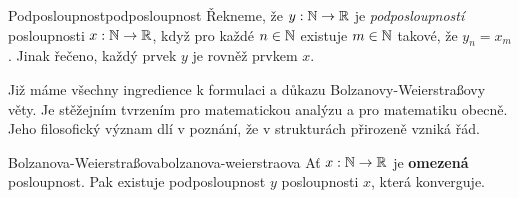 \begin{definition}{Podposloupnost}{podposloupnost}
 Řekneme, že $y:\mathbb{N} \to \mathbb{R}$ je \emph{podposloupností} posloupnosti $x:\mathbb{N} \to \mathbb{R}$,
 když pro každé $n \in \mathbb{N}$ existuje $m \in \mathbb{N}$ takové, že $y_n = x_m$. Jinak
 řečeno, každý prvek $y$ je rovněž prvkem $x$.
\end{definition}

Již máme všechny ingredience k formulaci a důkazu Bolzanovy-Weierstraßovy věty.
Je stěžejním tvrzením pro matematickou analýzu a pro matematiku obecně. Jeho
filosofický význam dlí v poznání, že v  strukturách přirozeně
vzniká řád.

\begin{theorem}{Bolzanova-Weierstraßova}{bolzanova-weierstraova}
 Ať $x:\mathbb{N} \to \mathbb{R}$ je \textbf{omezená} posloupnost. Pak existuje podposloupnost
 $y$ posloupnosti $x$, která konverguje.
\end{theorem}
